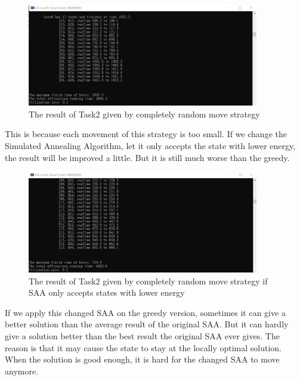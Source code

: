 \documentclass{llncs}
\begin{document}
	\begin{figure}[H]
		\begin{center}
			\includegraphics[width=0.9\textwidth]{Fig-task2-res-random.png}
			\caption{The result of Task2 given by completely random move strategy}
			\label{Fig-task2-res-random}
		\end{center}
	\end{figure}
	
	This is because each movement of this strategy is too small. If we change the Simulated Annealing Algorithm, let it only accepts the state with lower energy, the result will be improved a little. But it is still much worse than the greedy. 
	
	\begin{figure}[H]
	 	\begin{center}
	 		\includegraphics[width=0.9\textwidth]{Fig-task2-res-random-imp.png}
	 		\caption{The result of Task2 given by completely random move strategy if SAA only accepts states with lower energy}
	 		\label{Fig-task2-res-random-imp}
	 	\end{center}
	\end{figure}

	If we apply this changed SAA on the greedy version, sometimes it can give a better solution than the average result of the original SAA. But it can hardly give a solution better than the best result the original SAA ever gives. The reason is that it may cause the state to stay at the locally optimal solution. When the solution is good enough, it is hard for the changed SAA to move anymore. 
	
\end{document}
